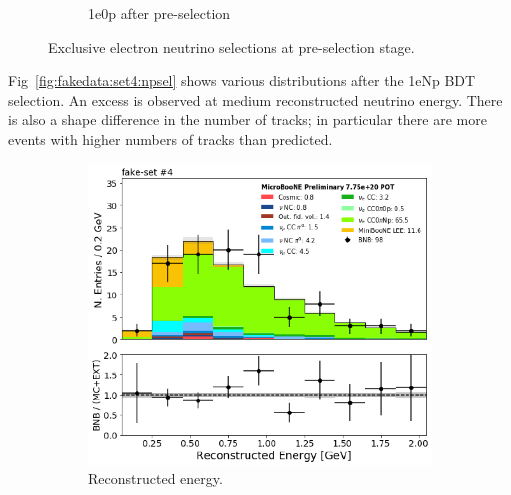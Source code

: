 \begin{figure}[H]
\begin{center}
\begin{subfigure}[b]{0.45\textwidth}
    \caption{\label{fig:fakedata:set4:2shr0p} 1e0p after pre-selection}
    \end{subfigure}
\caption{\label{fig:fakedata:set4:presel} Exclusive electron neutrino selections at pre-selection stage.}
\end{center}
\end{figure}

Fig~\ref{fig:fakedata:set4:npsel} shows various distributions after the 1eNp BDT selection.  An excess is observed at medium reconstructed neutrino energy. There is also a shape difference in the number of tracks; in particular there are more events with higher numbers of tracks than predicted. 

\begin{figure}[H] 
\begin{center}
    \begin{subfigure}[b]{0.45\textwidth}
    \centering
    \includegraphics[width=1.00\textwidth]{Fakedata/set4/Np_postsel_recoe.pdf}
    \caption{\label{fig:fakedata:set4:Np_postsel_recoe} Reconstructed energy.}
    \end{subfigure}
    \begin{subfigure}[b]{0.45\textwidth}
    \centering

\end{subfigure}
\end{center}
\end{figure}
